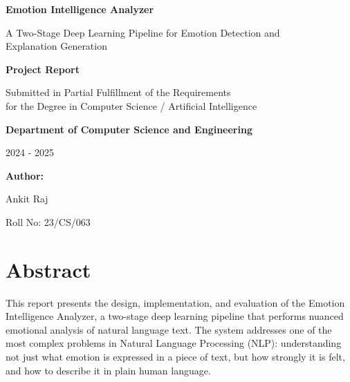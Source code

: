 \documentclass[12pt, a4paper]{report}
\begin{document}
\begin{titlepage}
    \centering
    \vspace*{2cm}
    
    {\Huge\bfseries Emotion Intelligence Analyzer\par}
    \vspace{0.5cm}
    {\Large A Two-Stage Deep Learning Pipeline for Emotion Detection and \\ Explanation Generation\par}
    
    \vspace{2cm}
    {\large\bfseries Project Report\par}
    \vspace{0.5cm}
    {\large Submitted in Partial Fulfillment of the Requirements \\
    for the Degree in Computer Science / Artificial Intelligence\par}
    
    \vspace{2cm}
    {\large\bfseries Department of Computer Science and Engineering\par}
    {\large 2024 - 2025\par}
    
    \vspace{2cm}
    {\large\bfseries Author:\par}
    {\large Ankit Raj\par}
    {\large Roll No: 23/CS/063\par}
    
    \vfill
\end{titlepage}

\tableofcontents
\newpage

\chapter*{Abstract}

This report presents the design, implementation, and evaluation of the Emotion Intelligence Analyzer, a two-stage deep learning pipeline that performs nuanced emotional analysis of natural language text. The system addresses one of the most complex problems in Natural Language Processing (NLP): understanding not just what emotion is expressed in a piece of text, but how strongly it is felt, and how to describe it in plain human language.
\end{document}
